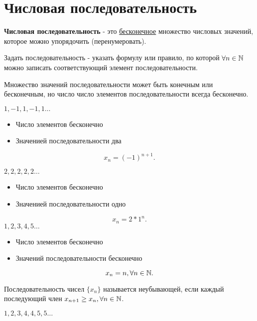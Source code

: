 
\section{Числовая последовательность}

\begin{definition}
  \textbf{Числовая последовательность} - это \underline{бесконечное} множество числовых значений, которое можно упорядочить (перенумеровать).
\end{definition}

Задать последовательность - указать формулу или правило, по которой $\forall n\in \mathbb{N}$ можно записать соответствующий элемент последовательности.

\begin{note}
  Множество значений последовательности может быть конечным или бесконечным, но число число элементов последовательности всегда бесконечно.
\end{note}

\begin{eg}
  $1, -1, 1, -1, 1\ldots$
  \begin{itemize}
    \item Число элементов бесконечно
    \item Значенией последовательности два
  \end{itemize}
  \[
    x_n = (-1)^{n+1}
  .\] 

  $2, 2, 2, 2, 2\ldots$
  \begin{itemize}
    \item Число элементов бесконечно
    \item Значенией последовательности одно
  \end{itemize}
  \[
    x_{n} = 2*1^{n}
  .\] 
  $1, 2, 3, 4, 5\ldots$
  \begin{itemize}
    \item Число элементов бесконечно
    \item Значений последовательности бесконечно
  \end{itemize}
  \[
  x_{n} = n, \forall n\in \mathbb{N}
  .\] 
\end{eg}

\begin{definition}
  Последовательность чисел $\{x_{n}\}$ называется неубывающей, если каждый последующий член $x_{n+1} \ge x_{n}, \forall n\in \mathbb{N}$.
\end{definition}
\begin{eg}
  $1, 2, 3, 4, 4, 5, 5\ldots$
\end{eg}

